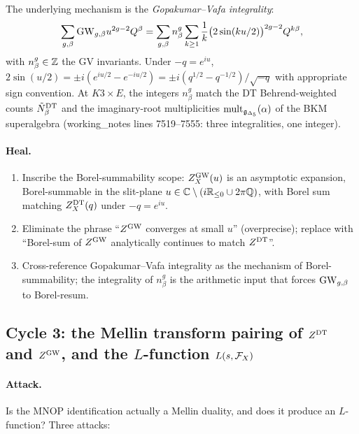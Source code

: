 The underlying mechanism is the \emph{Gopakumar--Vafa integrality}:
\[
\sum_{g,\beta}\mathrm{GW}_{g,\beta}u^{2g-2}Q^\beta
=\sum_{g,\beta}n^g_\beta\sum_{k\ge 1}\frac{1}{k}
\bigl(2\sin(ku/2)\bigr)^{2g-2}Q^{k\beta},
\]
with $n^g_\beta\in\mathbb{Z}$ the GV invariants. Under
$-q=e^{iu}$, $2\sin(u/2)=\pm i(e^{iu/2}-e^{-iu/2})=\pm i (q^{1/2}-q^{-1/2})/\sqrt{-q}$
with appropriate sign convention. At $K3\times E$, the integers
$n^g_\beta$ match the DT Behrend-weighted counts
$\tilde N^{\mathrm{DT}}_\beta$ and the imaginary-root multiplicities
$\mathrm{mult}_{\mathfrak{g}_{\Delta_5}}(\alpha)$ of the BKM superalgebra
(working\_notes lines 7519--7555: three integralities, one
integer).

\paragraph{Heal.}
\begin{enumerate}[label=(H\arabic*),leftmargin=1.5em]
\item Inscribe the Borel-summability scope: $Z^{\mathrm{GW}}_X(u)$ is an
  asymptotic expansion, Borel-summable in the slit-plane
  $u\in\mathbb{C}\setminus(i\mathbb{R}_{\le 0}\cup 2\pi\mathbb{Q})$, with Borel sum
  matching $Z^{\mathrm{DT}}_X(q)$ under $-q=e^{iu}$.
\item Eliminate the phrase ``$Z^{\mathrm{GW}}$ converges at small $u$''
  (overprecise); replace with ``Borel-sum of $Z^{\mathrm{GW}}$ analytically
  continues to match $Z^{\mathrm{DT}}$''.
\item Cross-reference Gopakumar--Vafa integrality as the mechanism
  of Borel-summability; the integrality of $n^g_\beta$ is the
  arithmetic input that forces $\mathrm{GW}_{g,\beta}$ to
  Borel-resum.
\end{enumerate}

\subsection*{Cycle 3: the Mellin transform pairing of $Z^{\mathrm{DT}}$ and
$Z^{\mathrm{GW}}$, and the $L$-function $L(s,\mathcal{F}_X)$}
\label{sec:w14a14-cycle-3}

\paragraph{Attack.}
Is the MNOP identification actually a Mellin duality, and does it
produce an $L$-function? Three attacks:


